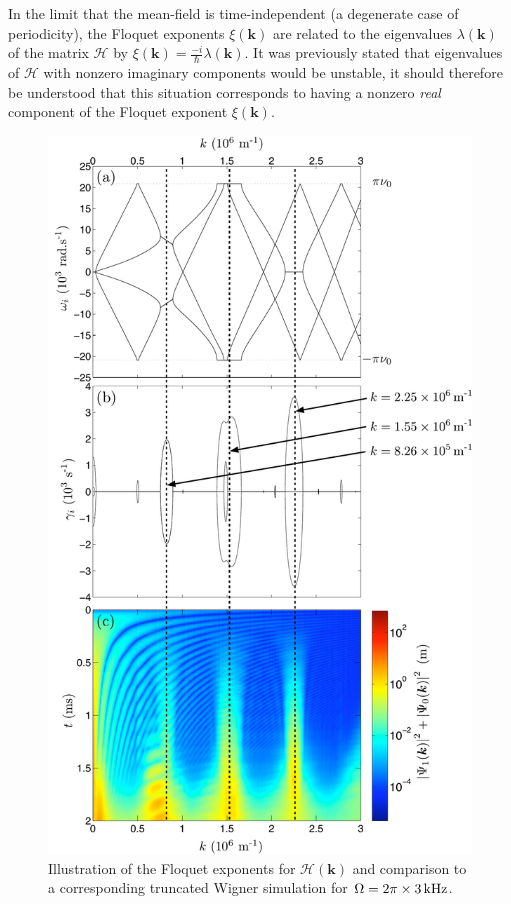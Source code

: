In the limit that the mean-field is time-independent (a degenerate case of periodicity), the Floquet exponents $\xi(\bm{k})$ are related to the eigenvalues $\lambda(\bm{k})$ of the matrix $\mathcal{H}$ by $\xi(\bm{k}) = \frac{-i}{\hbar} \lambda(\bm{k})$. It was previously stated that eigenvalues of $\mathcal{H}$ with nonzero imaginary components would be unstable, it should therefore be understood that this situation corresponds to having a nonzero \emph{real} component of the Floquet exponent $\xi(\bm{k})$.

\begin{figure}
    \centering
    \includegraphics[height=19cm]{CondensateEigenvalues}
    \caption{\label{Peaks:CondensateEigenvalues}
        Illustration of the Floquet exponents for $\mathcal{H}(\bm{k})$ and comparison to a corresponding truncated Wigner simulation for $\Omega = 2\pi \times \unit[3]{kHz}$.
}
\end{figure}
